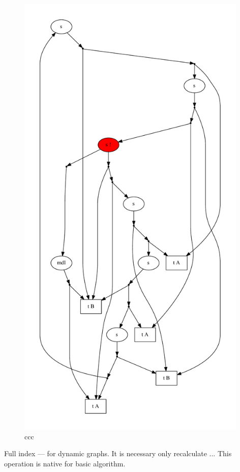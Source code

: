 \documentclass{sig-alternate} %
\begin{document}
\begin{figure}[h]
    \begin{center}
        \includegraphics[width=11cm]{dot/AnBn.pdf}
        \caption{ccc}
        \label{pic1}        
    \end{center}
\end{figure}



Full index --- for dynamic graphs. It is necessary only recalculate ... This operation is native for basic algorithm.



%
\end{document}
